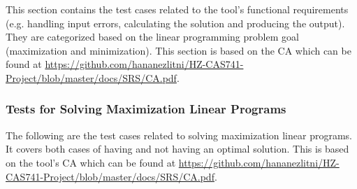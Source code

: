 \documentclass[12pt, titlepage]{article}
\begin{document}
This section contains the test cases related to the tool’s functional 
requirements (e.g. handling input errors, calculating the solution and 
producing the output). They are categorized based on the linear programming 
problem goal (maximization and minimization). This section is based on the CA 
which can be found at 
\url{https://github.com/hananezlitni/HZ-CAS741-Project/blob/master/docs/SRS/CA.pdf}.


\subsubsection{Tests for Solving Maximization Linear Programs}

The following are the test cases related to solving maximization linear 
programs. It covers both cases of having and not having an optimal solution. 
This is based on the tool's CA which can be found at 
\url{https://github.com/hananezlitni/HZ-CAS741-Project/blob/master/docs/SRS/CA.pdf}.



\end{document}
